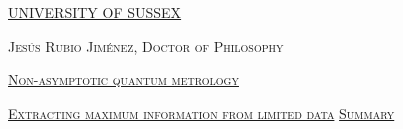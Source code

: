 \documentclass[a4paper,12pt,oneside]{report}
\newcommand{\linespacing}{1}
\renewcommand{\baselinestretch}{\linespacing}
\begin{document}
% 
%
% 
%
%
%
%
\thispagestyle{empty}
\newpage
\null\vskip10mm
\begin{center}
\large
\underline{UNIVERSITY OF SUSSEX}
\vskip20mm

\textsc{Jes\'{u}s Rubio Jim\'{e}nez, Doctor of Philosophy}
\vskip20mm

\underline{\textsc{Non-asymptotic quantum metrology}}
\vskip0mm

\underline{\textsc{Extracting maximum information from limited data}}
\vskip20mm
\underline{\textsc{Summary}}
\vskip2mm
\end{center}

\renewcommand{\baselinestretch}{1.0}
\small\normalsize
\end{document}
